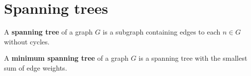 \newpage 
\section{Spanning trees}

\begin{Def}

    A \textbf{spanning tree} of a graph $G$ is a subgraph containing edges to each $n\in G$ without cycles.
\end{Def}

\begin{Def}

    A \textbf{minimum spanning tree} of a graph $G$ is a spanning tree with the smallest sum of edge weights.
\end{Def}

